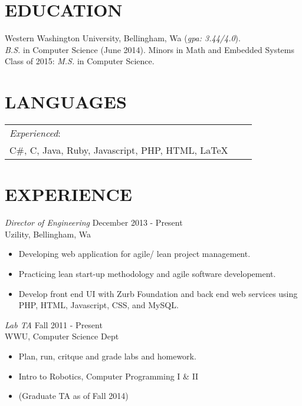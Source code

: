 \documentclass[line,margin]{res}
\begin{document}
\address{23714 NE 61st Street, Redmond, Wa, 98053}
\address{(425) 241-7977 \hspace{13mm} kyle.rader@ieee.org}
 
\begin{resume}
 
\section{EDUCATION}   Western Washington University, Bellingham, Wa ({\sl gpa: 3.44/4.0}).\\
			     {\sl B.S.} in Computer Science (June 2014). Minors in Math and Embedded Systems\\
			      Class of 2015: {\sl M.S.} in Computer Science.
			      
  
\section{LANGUAGES}
	\begin{table}[h]
		\begin{tabular}{ l l l }
			{\sl Experienced}: \\
			C\#, C, Java, Ruby, Javascript, PHP, HTML, {\LaTeX}					
		\end{tabular}
 	\end{table}

\section{EXPERIENCE}

		{\sl Director of Engineering} \hfill December 2013 - Present \\
                	Uzility, Bellingham, Wa
               	 \begin{itemize}  \itemsep -2pt
                		\item Developing web application for agile/ lean project management.
                		\item Practicing lean start-up methodology and agile software developement. 
                		\item Develop front end UI with Zurb Foundation and back end web services using PHP, HTML, Javascript, CSS, and MySQL.
                	\end{itemize}

                	{\sl Lab TA} \hfill        Fall 2011 - Present \\
                	WWU, Computer Science Dept
                  	\begin{itemize} \itemsep -2pt
                   		\item Plan, run, critque and grade labs and homework.
			\item Intro to Robotics, Computer Programming I \& II
			\item (Graduate TA as of Fall 2014)
                   	\end{itemize}


\end{resume}
\end{document}
